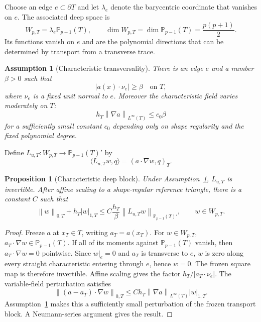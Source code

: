\documentclass[preprint,12pt]{elsarticle}
\newtheorem{proposition}[theorem]{Proposition}
\newtheorem{assumption}[theorem]{Assumption}
\newcommand{\PP}{\mathbb P}
\newcommand{\grad}{\nabla}
\newcommand{\norm}[1]{\left\lVert #1\right\rVert}
\newcommand{\abs}[1]{\left\lvert #1\right\rvert}
\begin{document}
Choose an edge $e\subset\partial T$ and let $\lambda_e$ denote the barycentric coordinate that vanishes on $e$.  The associated deep space is
\begin{equation}\label{eq:deep}
 W_{p,T}=\lambda_e\PP_{p-1}(T),\qquad \dim W_{p,T}=\dim\PP_{p-1}(T)=\frac{p(p+1)}2.
\end{equation}
Its functions vanish on $e$ and are the polynomial directions that can be determined by transport from a transverse trace.

\begin{assumption}[Characteristic transversality]\label{ass:trans}
There is an edge $e$ and a number $\beta>0$ such that
\begin{equation}\label{eq:trans}
 \abs{a(x)\cdot\nu_e}\ge\beta\quad\text{on }T,
\end{equation}
where $\nu_e$ is a fixed unit normal to $e$.  Moreover the characteristic field varies moderately on $T$:
\begin{equation}\label{eq:curv}
 h_T\norm{\grad a}_{L^\infty(T)}\le c_0\beta
\end{equation}
for a sufficiently small constant $c_0$ depending only on shape regularity and the fixed polynomial degree.
\end{assumption}

Define $L_{u,T}:W_{p,T}\to\PP_{p-1}(T)'$ by
\begin{equation}\label{eq:Lu}
 \langle L_{u,T}w,q\rangle=(a\cdot\grad w,q)_T.
\end{equation}

\begin{proposition}[Characteristic deep block]\label{prop:block}
Under Assumption~\ref{ass:trans}, $L_{u,T}$ is invertible.  After affine scaling to a shape-regular reference triangle, there is a constant $C$ such that
\begin{equation}\label{eq:blockbound}
 \norm{w}_{0,T}+h_T\abs{w}_{1,T}
 \le C\frac{h_T}{\beta}\norm{L_{u,T}w}_{\PP_{p-1}(T)'},\qquad w\in W_{p,T}.
\end{equation}
\end{proposition}

\begin{proof}
Freeze $a$ at $x_T\in T$, writing $a_T=a(x_T)$.  For $w\in W_{p,T}$, $a_T\cdot\grad w\in\PP_{p-1}(T)$.  If all of its moments against $\PP_{p-1}(T)$ vanish, then $a_T\cdot\grad w=0$ pointwise.  Since $w|_e=0$ and $a_T$ is transverse to $e$, $w$ is zero along every straight characteristic entering through $e$, hence $w=0$.  The frozen square map is therefore invertible.  Affine scaling gives the factor $h_T/|a_T\cdot\nu_e|$.  The variable-field perturbation satisfies
\[
 \norm{(a-a_T)\cdot\grad w}_{0,T}
 \le Ch_T\norm{\grad a}_{L^\infty(T)}\abs{w}_{1,T}.
\]
Assumption~\ref{ass:trans} makes this a sufficiently small perturbation of the frozen transport block.  A Neumann-series argument gives the result.
\end{proof}
\end{document}
